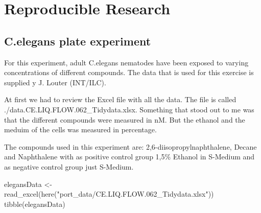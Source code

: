 \documentclass[
]{book}
\newenvironment{Shaded}{\begin{snugshade}}{\end{snugshade}}
\newcommand{\FunctionTok}[1]{\textcolor[rgb]{0.00,0.00,0.00}{#1}}
\newcommand{\NormalTok}[1]{#1}
\newcommand{\OtherTok}[1]{\textcolor[rgb]{0.56,0.35,0.01}{#1}}
\newcommand{\StringTok}[1]{\textcolor[rgb]{0.31,0.60,0.02}{#1}}
\begin{document}
\hypertarget{reproducible-research}{%
\chapter{Reproducible Research}\label{reproducible-research}}

\hypertarget{c.elegans-plate-experiment}{%
\section{C.elegans plate experiment}\label{c.elegans-plate-experiment}}

For this experiment, adult C.elegans nematodes have been exposed to varying concentrations of different compounds.
The data that is used for this exercise is supplied y J. Louter (INT/ILC).

At first we had to review the Excel file with all the data. The file is called ./data.CE.LIQ.FLOW.062\_Tidydata.xlsx.
Something that stood out to me was that the different compounds were measured in nM. But the ethanol and the meduim of the cells was measured in percentage.

The compounds used in this experiment are: 2,6-diisopropylnaphthalene, Decane and Naphthalene with as positive control group 1,5\% Ethanol in S-Medium and as negative control group just S-Medium.

\begin{Shaded}
\begin{Highlighting}[]
\NormalTok{elegansData }\OtherTok{\textless{}{-}} \FunctionTok{read\_excel}\NormalTok{(}\FunctionTok{here}\NormalTok{(}\StringTok{"port\_data/CE.LIQ.FLOW.062\_Tidydata.xlsx"}\NormalTok{))}
\FunctionTok{tibble}\NormalTok{(elegansData)}
\end{Highlighting}
\end{Shaded}
\end{document}

